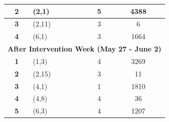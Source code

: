\begin{table}[]
\begin{tabular}{clcc}
\textbf{2}             & (2,1)             & 5                                                                           & 4388                                                                                    \\ \hline
\textbf{3}             & (2,11)            & 3                                                                           & 6                                                                                       \\ \hline
\textbf{4}             & (6,1)             & 3                                                                           & 1664                                                                                    \\ \hline
\multicolumn{4}{c}{\cellcolor[HTML]{ECF4FF}\textbf{After Intervention Week (May 27 - June 2)}}                                                                                                                     \\ \hline
\textbf{1}             & (1,3)             & 4                                                                           & 3269                                                                                    \\ \hline
\textbf{2}             & (2,15)            & 3                                                                           & 11                                                                                      \\ \hline
\textbf{3}             & (4,1)             & 1                                                                           & 1810                                                                                    \\ \hline
\textbf{4}             & (4,8)             & 4                                                                           & 36                                                                                      \\ \hline
\textbf{5}             & (6,3)             & 4                                                                           & 1207                                                                                    \\ \hline\midrule
\end{tabular}
\end{table}




